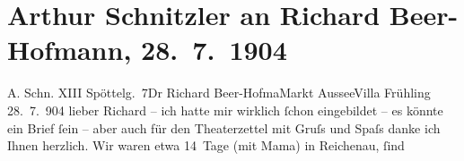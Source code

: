 

         
         \renewcommand{\erwaehntePersonen}{Personen: Richard Beer-Hofmann, Felix Salten, Louise Schnitzler}
         \renewcommand{\erwaehnteOrte}{Orte: Bad Aussee, Bad Ischl, Edmund-Weiß-Gasse, I., Innere Stadt, Nasswald, Reichenau an der Rax, Villa Frühling, Wien}
         \renewcommand{\erwaehnteWerke}{Werke: Der Graf von Charolais. Ein Trauerspiel}
               \section[Arthur Schnitzler an Richard Beer-Hofmann, 28. 7. 1904]{ Arthur Schnitzler an Richard Beer-Hofmann, 28. 7. 1904}\nopagebreak{}\rehead{ }\begin{ledgroupsized}[t]{13cm}\normalsize\beginnumbering \toendnotes[C]{\smallbreak\pagebreak[2]} 
\toendnotes[C]{\smallbreak}\pstart{}{\pb}A. Schn. XIII Spöttelg. 7\pend{}{\bigskip}\pstart{}{\pb}Dr Richard Beer-Hofma{\geminationn}\pend{}\pstart{}Markt Aussee\pend{}\pstart{}Villa Frühling\pend{}{\bigskip}\pstart
           \raggedleft{}{\pb}28. 7. 904\pend
           \pstart
           lieber Richard – ich hatte mir wirklich ſchon eingebildet – es
               könnte ein Brief ſein – aber auch für den Theaterzettel mit Gruſs und Spaſs danke ich
               Ihnen herzlich. Wir waren etwa 14 Tage \introOben{}(\introOben{}mit Mama\introOben{})\introOben{} in Reichenau, ſind

\end{ledgroupsized}
